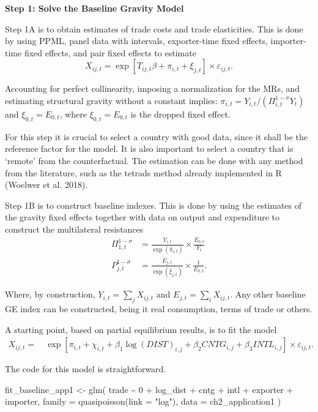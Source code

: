 \documentclass[12pt,reqno,oneside,pdftex]{formato-puc/puctesis} %
\newenvironment{Shaded}{\begin{snugshade}}{\end{snugshade}}
\newcommand{\AttributeTok}[1]{\textcolor[rgb]{0.77,0.63,0.00}{#1}}
\newcommand{\DecValTok}[1]{\textcolor[rgb]{0.00,0.00,0.81}{#1}}
\newcommand{\FunctionTok}[1]{\textcolor[rgb]{0.00,0.00,0.00}{#1}}
\newcommand{\NormalTok}[1]{#1}
\newcommand{\OtherTok}[1]{\textcolor[rgb]{0.56,0.35,0.01}{#1}}
\newcommand{\SpecialCharTok}[1]{\textcolor[rgb]{0.00,0.00,0.00}{#1}}
\newcommand{\StringTok}[1]{\textcolor[rgb]{0.31,0.60,0.02}{#1}}
\begin{document}
\textbf{Step 1: Solve the Baseline Gravity Model}

Step 1A is to obtain estimates of trade costs and trade elasticities.
This is done by using PPML, panel data with intervals, exporter-time
fixed effects, importer-time fixed effects, and pair fixed effects to
estimate \begin{equation*}
X_{ij,t} = \exp[T_{ij,t}\beta + \pi_{i,t} + \xi_{j,t}] \times \varepsilon_{ij,t}.
\end{equation*}

Accounting for perfect collinearity, imposing a normalization for the
MRs, and estimating structural gravity without a constant implies:
\(\pi_{i,t} = Y_{i,t} / (\Pi^{1-\sigma}_{i,t} Y_t)\) and
\(\xi_{0,t} = E_{0,t}\), where \(\xi_{0,t} = E_{0,t}\) is the dropped
fixed effect.

For this step it is crucial to select a country with good data, since it
shall be the reference factor for the model. It is also important to
select a country that is `remote' from the counterfactual. The
estimation can be done with any method from the literature, such as the
tetrads method already implemented in R (Woelwer et al. 2018).

Step 1B is to construct baseline indexes. This is done by using the
estimates of the gravity fixed effects together with data on output and
expenditure to construct the multilateral resistances \begin{align*}
\Pi^{1-\sigma}_{1,t} &= \frac{Y_{i,t}}{\exp(\hat{\pi}_{i,t})} \times \frac{E_{0,t}}{Y_t} \\
P^{1-\sigma}_{j,t} &= \frac{E_{j,t}}{\exp(\hat{\xi}_{j,t})} \times \frac{1}{E_{0,t}}.
\end{align*}

Where, by construction, \(Y_{i,t} = \sum_j X_{ij,t}\) and
\(E_{j,t} = \sum_i X_{ij,t}\). Any other baseline GE index can be
constructed, being it real consumption, terms of trade or others.

A starting point, based on partial equilibrium results, is to fit the
model \begin{align*}
X_{ij,t} =& \:\exp\left[\pi_{i,t} + \chi_{i,t} + \beta_1 \log(DIST)_{i,j} + \beta_2 CNTG_{i,j} + \beta_3 INTL_{i,j}\right] \times \varepsilon_{ij,t}.
\end{align*}

The code for this model is straightforward.

\begin{Shaded}
\begin{Highlighting}[]
\NormalTok{fit\_baseline\_app1 }\OtherTok{\textless{}{-}} \FunctionTok{glm}\NormalTok{(}
\NormalTok{  trade }\SpecialCharTok{\textasciitilde{}} \DecValTok{0} \SpecialCharTok{+}\NormalTok{ log\_dist }\SpecialCharTok{+}\NormalTok{ cntg }\SpecialCharTok{+}\NormalTok{ intl }\SpecialCharTok{+}\NormalTok{ exporter }\SpecialCharTok{+}\NormalTok{ importer,}
  \AttributeTok{family =} \FunctionTok{quasipoisson}\NormalTok{(}\AttributeTok{link =} \StringTok{"log"}\NormalTok{),}
  \AttributeTok{data =}\NormalTok{ ch2\_application1}
\NormalTok{)}
\end{Highlighting}
\end{Shaded}
\end{document}
